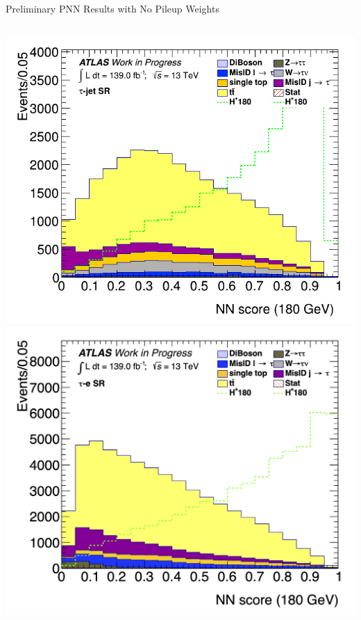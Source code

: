 \documentclass[aspectratio=169,xcolor=table]{beamer}
\begin{document}
\begin{frame}{Preliminary PNN Results with No Pileup Weights}
\begin{columns}

        \includegraphics[height=.4\textheight,keepaspectratio=true]{Scores/taujet/rnnTest_1p_3p_noweight/clf_score_GB200_mass_180to180_SR_TAUJET.png}
        \includegraphics[height=.4\textheight,keepaspectratio=true]{Scores/taulep/myOutDirClfEval_1p_noUpsilon_test_full/clf_score_GB200_mass_180to180_SR_TAUEL.png}


\end{columns}
\end{frame}
\end{document}
